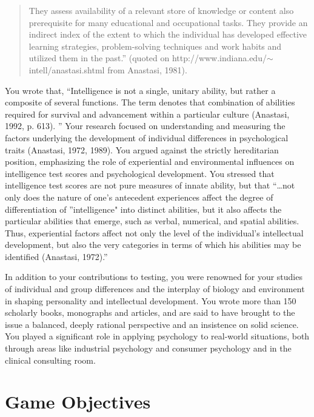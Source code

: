 \begin{quote}

They assess availability of a relevant store of knowledge or content also prerequisite for many educational and occupational tasks.
They provide an indirect index of the extent to which the individual has developed effective learning strategies, problem-solving techniques and work habits and utilized them in the past.” (quoted on http:\slash \slash www.indiana.edu\slash \ensuremath{\sim}intell\slash anastasi.shtml from Anastasi, 1981).
\end{quote}

You wrote that, ``Intelligence is not a single, unitary ability, but rather a composite of several functions. The term denotes that combination of abilities required for survival and advancement within a particular culture (Anastasi, 1992, p. 613). ” Your research focused on understanding and measuring the factors underlying the development of individual differences in psychological traits (Anastasi, 1972, 1989). You argued against the strictly hereditarian position, emphasizing the role of experiential and environmental influences on intelligence test scores and psychological development. You stressed that intelligence test scores are not pure measures of innate ability, but that “{\ldots}not only does the nature of one's antecedent experiences affect the degree of differentiation of ''intelligence" into distinct abilities, but it also affects the particular abilities that emerge, such as verbal, numerical, and spatial abilities. Thus, experiential factors affect not only the level of the individual's intellectual development, but also the very categories in terms of which his abilities may be identified (Anastasi, 1972).”

In addition to your contributions to testing, you were renowned for your studies of individual and group differences and the interplay of biology and environment in shaping personality and intellectual development. You wrote more than 150 scholarly books, monographs and articles, and are said to have brought to the issue a balanced, deeply rational perspective and an insistence on solid science. You played a significant role in applying psychology to real-world situations, both through areas like industrial psychology and consumer psychology and in the clinical consulting room.

\section{Game Objectives}
\label{gameobjectives}

